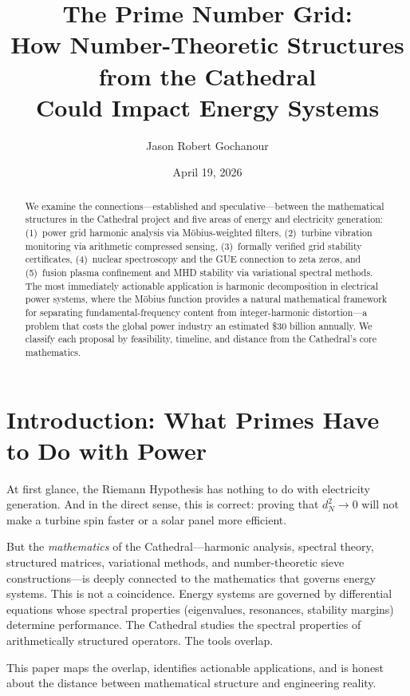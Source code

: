 \documentclass[11pt,a4paper]{article}
\title{%
  The Prime Number Grid:\\
  How Number-Theoretic Structures from the Cathedral\\
  Could Impact Energy Systems%
}
\author{
  Jason Robert Gochanour
}
\date{April 19, 2026}
\begin{document}
\maketitle

\begin{abstract}
We examine the connections---established and speculative---between
the mathematical structures in the Cathedral project and five areas
of energy and electricity generation: (1)~power grid harmonic
analysis via M\"obius-weighted filters, (2)~turbine vibration
monitoring via arithmetic compressed sensing, (3)~formally verified
grid stability certificates, (4)~nuclear spectroscopy and the
GUE connection to zeta zeros, and (5)~fusion plasma confinement
and MHD stability via variational spectral methods. The most
immediately actionable application is harmonic decomposition in
electrical power systems, where the M\"obius function provides a
natural mathematical framework for separating fundamental-frequency
content from integer-harmonic distortion---a problem that costs the
global power industry an estimated \$30 billion annually. We
classify each proposal by feasibility, timeline, and distance from
the Cathedral's core mathematics.
\end{abstract}

\tableofcontents

\section{Introduction: What Primes Have to Do with Power}

At first glance, the Riemann Hypothesis has nothing to do with
electricity generation. And in the direct sense, this is correct:
proving that $d_N^2 \to 0$ will not make a turbine spin faster or a
solar panel more efficient.

But the \emph{mathematics} of the Cathedral---harmonic analysis,
spectral theory, structured matrices, variational methods, and
number-theoretic sieve constructions---is deeply connected to the
mathematics that governs energy systems. This is not a coincidence.
Energy systems are governed by differential equations whose spectral
properties (eigenvalues, resonances, stability margins) determine
performance. The Cathedral studies the spectral properties of
arithmetically structured operators. The tools overlap.

This paper maps the overlap, identifies actionable applications,
and is honest about the distance between mathematical structure
and engineering reality.
\end{document}
